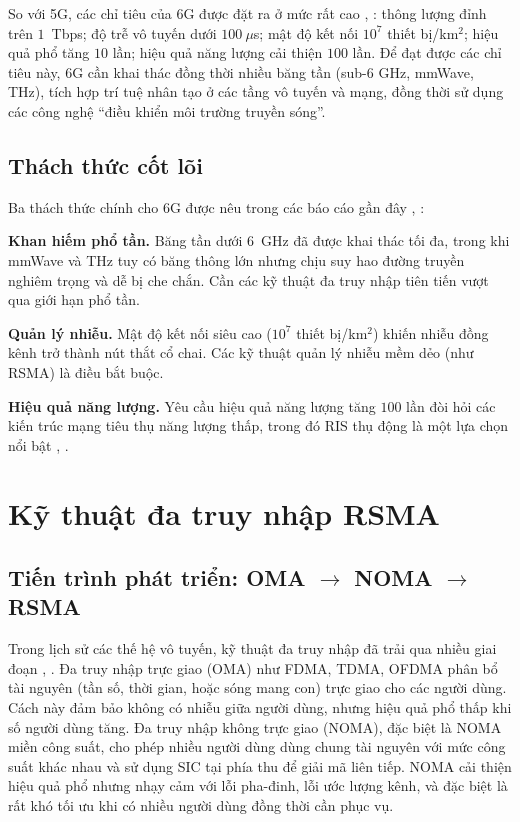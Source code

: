 So với 5G, các chỉ tiêu của 6G được đặt ra ở mức rất cao
\cite{noor2025aimulti}, \cite{noman2026drl6g}: thông lượng đỉnh trên $1$~Tbps; độ
trễ vô tuyến dưới $100~\mu$s; mật độ kết nối $10^7$ thiết bị/km$^2$; hiệu
quả phổ tăng $10$ lần; hiệu quả năng lượng cải thiện $100$ lần. Để đạt được
các chỉ tiêu này, 6G cần khai thác đồng thời nhiều băng tần (sub-6 GHz,
mmWave, THz), tích hợp trí tuệ nhân tạo ở các tầng vô tuyến và mạng, đồng
thời sử dụng các công nghệ ``điều khiển môi trường truyền sóng''.

\subsection{Thách thức cốt lõi}

Ba thách thức chính cho 6G được nêu trong các báo cáo gần đây
\cite{adams2024rsma}, \cite{priya2024noma}:

\textbf{Khan hiếm phổ tần.} Băng tần dưới 6~GHz đã được khai thác tối đa,
trong khi mmWave và THz tuy có băng thông lớn nhưng chịu suy hao đường
truyền nghiêm trọng và dễ bị che chắn. Cần các kỹ thuật đa truy nhập tiên
tiến vượt qua giới hạn phổ tần.

\textbf{Quản lý nhiễu.} Mật độ kết nối siêu cao ($10^7$ thiết bị/km$^2$)
khiến nhiễu đồng kênh trở thành nút thắt cổ chai. Các kỹ thuật quản lý
nhiễu mềm dẻo (như RSMA) là điều bắt buộc.

\textbf{Hiệu quả năng lượng.} Yêu cầu hiệu quả năng lượng tăng $100$ lần đòi
hỏi các kiến trúc mạng tiêu thụ năng lượng thấp, trong đó RIS thụ động là
một lựa chọn nổi bật \cite{wu2020smart}, \cite{mu2022simultaneously}.

\section{Kỹ thuật đa truy nhập RSMA}
\label{sec:rsma}

\subsection{Tiến trình phát triển: OMA $\to$ NOMA $\to$ RSMA}

Trong lịch sử các thế hệ vô tuyến, kỹ thuật đa truy nhập đã trải qua nhiều
giai đoạn \cite{mao2022rsma}, \cite{priya2024noma}. Đa truy nhập trực giao
(OMA) như FDMA, TDMA, OFDMA phân bổ tài nguyên (tần số, thời gian, hoặc
sóng mang con) trực giao cho các người dùng. Cách này đảm bảo không có
nhiễu giữa người dùng, nhưng hiệu quả phổ thấp khi số người dùng tăng.
Đa truy nhập không trực giao (NOMA), đặc biệt là NOMA miền công
suất, cho phép nhiều người dùng dùng chung tài nguyên với mức công suất
khác nhau và sử dụng SIC tại phía thu để giải mã liên tiếp. NOMA cải
thiện hiệu quả phổ nhưng nhạy cảm với lỗi pha-đinh, lỗi ước lượng kênh,
và đặc biệt là rất khó tối ưu khi có nhiều người dùng đồng thời cần phục
vụ.

